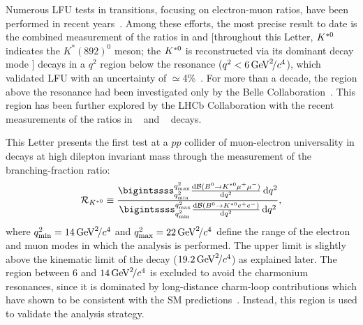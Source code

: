 Numerous LFU tests in \bsll transitions, focusing on electron-muon
ratios, have been performed in recent
years~\cite{LHCb-PAPER-2019-040,LHCb-PAPER-2021-004,Belle:2019oag,LHCb-PAPER-2021-038,LHCb-PAPER-2022-045,LHCb-PAPER-2022-046,CMS:2024syx,LHCb-PAPER-2024-032,LHCb-PAPER-2022-014,LHCb-PAPER-2024-056}.
Among these efforts, the most precise result to date is the combined measurement of the ratios in \decay{\Bp}{\Kp \ell^+ \ell^-} and \decay{\Bz}{\Kstarz \ell^+ \ell^-} [throughout this Letter, ${{K}^{*0}}$
indicates the $K^*(892)^0$ meson; the ${{K}^{*0}}$ is reconstructed via its dominant decay mode ] decays in a $q^2$ region
below the \jpsi resonance ($q^2 < 6\text{\,Ge\kern -0.1em V}^2\!/c^4$), which validated LFU with an uncertainty of $\simeq$4\%~\cite{LHCb-PAPER-2022-046}. For more than a decade,
the \qsq region above the \psitwos resonance had been investigated only by the Belle Collaboration~\cite{Belle:2019oag}. This region has been further explored by the LHCb Collaboration with the recent measurements of the ratios in ~\cite{LHCb-PAPER-2024-032} and \decay{\Bp}{\Kp \ell^+ \ell^-}~\cite{LHCb-PAPER-2024-056} decays.

This Letter presents the first test at a $pp$ collider of muon-electron universality in \decay{\Bz}{\Kstarz \ell^+ \ell^-} decays at high dilepton invariant mass through the measurement of the branching-fraction ratio:
\begin{equation}
{\cal{R}}_{\Kstarz} \equiv \dfrac{\bigintssss_{q^2_{\mathrm{min}}}^{q^2_{\mathrm{max}}} \frac{\deriv\mathcal{B}(B^0 \to \Kstarz \mu^+ \mu^-)}{\deriv q^2} \, \deriv q^2}{\bigintssss_{q^2_{\mathrm{min}}}^{q^2_{\mathrm{max}}} \frac{\deriv \mathcal{B}(B^0 \to \Kstarz e^+ e^-)}{\deriv q^2} \, \deriv q^2},
\end{equation}
where $q^2_{\mathrm{min}}=14\text{\,Ge\kern -0.1em V}^2\!/c^4$ and $q^2_{\mathrm{max}}=22\text{\,Ge\kern -0.1em V}^2\!/c^4$ define the \qsq range of the electron and muon modes in which the analysis
is performed. The upper limit is slightly above the kinematic limit of the decay ($19.2\text{\,Ge\kern -0.1em V}^2\!/c^4$) as explained later. The region between $6$ and $14\text{\,Ge\kern -0.1em V}^2\!/c^4$ is excluded to avoid the charmonium resonances, since it is dominated by
long-distance charm-loop contributions which have shown to be consistent with the SM predictions~\cite{PDG2024}. Instead, this region is used to validate the analysis
strategy.

